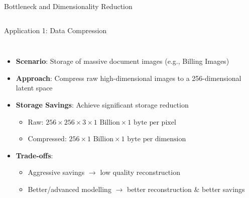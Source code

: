 \documentclass[5pt,aspectratio=169]{beamer}
\begin{document}
\begin{frame}{Bottleneck and Dimensionality Reduction}
\begin{columns}
  \end{columns}
\end{frame}

\begin{frame}{Application 1: Data Compression}
  \begin{columns}
    \begin{itemize}
      \item \textbf{Scenario}: Storage of massive document images (e.g., Billing Images)
      \item \textbf{Approach}: Compress raw high-dimensional images to a 256-dimensional latent space
      \item \textbf{Storage Savings}: Achieve significant storage reduction
        \begin{itemize}
          \item Raw: $256 \times 256 \times 3 \times 1\text{ Billion} \times 1\text{ byte per pixel}$
          \item Compressed: $256 \times 1\text{ Billion} \times 1\text{ byte per dimension}$
        \end{itemize}
      \item \textbf{Trade-offs}:
        \begin{itemize}
          \item Aggressive savings $\rightarrow$ low quality reconstruction
          \item Better/advanced modelling $\rightarrow$ better reconstruction \& better savings
        \end{itemize}
    \end{itemize}
    
    \centering
\end{columns}
\end{frame}
\end{document}
